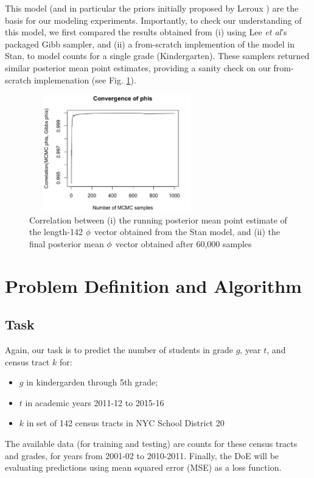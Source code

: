 \documentclass[journal]{IEEEtran}
\begin{document}
This model (and in particular the priors initially proposed by Leroux \cite{leroux2000estimation}) are the basis for our modeling experiments. Importantly, to check our understanding of this model, we first compared the results obtained from (i) using Lee \emph{et al}'s packaged Gibb sampler, and (ii) a from-scratch implemention of the model in Stan, to model counts for a single grade (Kindergarten). These samplers returned similar posterior mean point estimates, providing a sanity check on our from-scratch implemenation (see Fig. \ref{fig:phis_correlation}).

\begin{figure}
    \centering
    \includegraphics[width=3in,height=2in,clip,keepaspectratio]{convergence_of_phis.png}
    \caption{Correlation between (i) the running posterior mean point estimate of the length-142 \(\boldmath{\phi}\) vector obtained from the Stan model, and (ii) the final posterior mean \(\boldmath{\phi}\) vector obtained after 60,000 samples}
    \label{fig:phis_correlation}
\end{figure}

\section{Problem Definition and Algorithm}
\subsection{Task}
Again, our task is to predict the number of students in grade $g$, year $t$, and census tract $k$ for:
\begin{itemize}
\item $g$ in kindergarden through 5th grade;
\item $t$ in academic years 2011-12 to 2015-16
\item $k$ in set of 142 census tracts in NYC School District 20
\end{itemize}
The available data (for training and testing) are counts for these census tracts and grades, for years from 2001-02 to 2010-2011. Finally, the DoE will be evaluating predictions using mean squared error (MSE) as a loss function.
\end{document}

